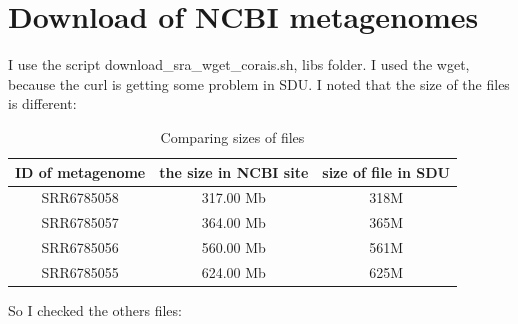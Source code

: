 \documentclass[12pt, a4paper]{report}
\begin{document}
\section{Download of NCBI metagenomes}
I use the script download\_sra\_wget\_corais.sh, libs folder. I used the wget, because the curl is getting some problem in SDU.
I noted that the size of the files is different:


\begin{table}[!htb]
  \caption{Comparing sizes of files}
  \centering
  \begin{tabular}{ccc}
  \hline 
       ID of metagenome&the size in NCBI site&size of file in SDU\\
  \hline
	SRR6785058&317.00 Mb&318M\\
	SRR6785057&364.00 Mb&365M\\
	SRR6785056&560.00 Mb&561M\\
	SRR6785055&624.00 Mb&625M\\
  \hline
  \end{tabular}
  \label{table2}
 \end{table}

So I checked the others files:
\end{document}
